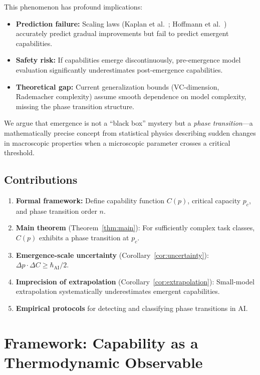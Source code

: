 \documentclass[12pt]{article}
\theoremstyle{definition}
\theoremstyle{remark}
\begin{document}
This phenomenon has profound implications:
\begin{itemize}
  \item \textbf{Prediction failure:} Scaling laws (Kaplan et al.~\cite{kaplan2020scaling}; Hoffmann et al.~\cite{hoffmann2022training}) accurately predict gradual improvements but fail to predict emergent capabilities.
  \item \textbf{Safety risk:} If capabilities emerge discontinuously, pre-emergence model evaluation significantly underestimates post-emergence capabilities.
  \item \textbf{Theoretical gap:} Current generalization bounds (VC-dimension, Rademacher complexity) assume smooth dependence on model complexity, missing the phase transition structure.
\end{itemize}

We argue that emergence is not a ``black box'' mystery but a \emph{phase transition}---a mathematically precise concept from statistical physics describing sudden changes in macroscopic properties when a microscopic parameter crosses a critical threshold.

\subsection{Contributions}

\begin{enumerate}
  \item \textbf{Formal framework:} Define capability function $C(p)$, critical capacity $p_c$, and phase transition order $n$.
  \item \textbf{Main theorem} (Theorem~\ref{thm:main}): For sufficiently complex task classes, $C(p)$ exhibits a phase transition at $p_c$.
  \item \textbf{Emergence-scale uncertainty} (Corollary~\ref{cor:uncertainty}): $\Delta p \cdot \Delta C \geq \hbar_{\text{AI}}/2$.
  \item \textbf{Imprecision of extrapolation} (Corollary~\ref{cor:extrapolation}): Small-model extrapolation systematically underestimates emergent capabilities.
  \item \textbf{Empirical protocols} for detecting and classifying phase transitions in AI.
\end{enumerate}

\section{Framework: Capability as a Thermodynamic Observable}
\end{document}
